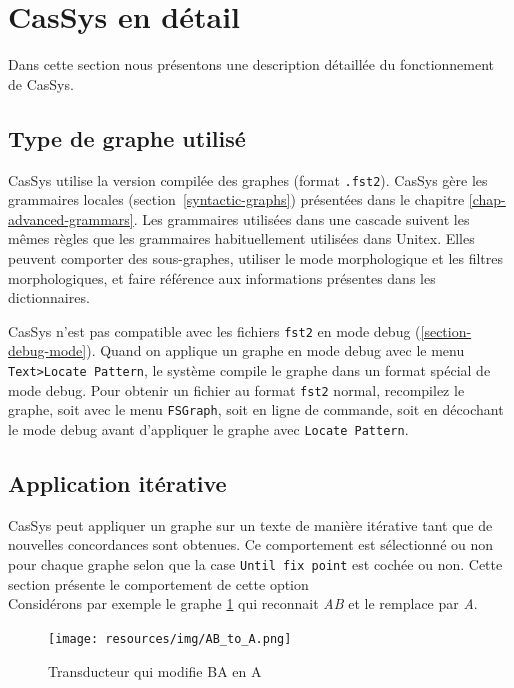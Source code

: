 \section{CasSys en détail}

Dans cette section nous présentons une description détaillée du fonctionnement de CasSys.

\subsection{Type de graphe utilisé}
\label{graphs-for-cassys}

CasSys utilise la version compilée des graphes (format \verb+.fst2+). CasSys gère les grammaires locales
(section~\ref{syntactic-graphs}) présentées dans le chapitre \ref{chap-advanced-grammars}.
Les grammaires utilisées dans une cascade suivent les mêmes règles que les grammaires habituellement
utilisées dans Unitex. Elles peuvent comporter des sous-graphes, utiliser le mode morphologique et les filtres
morphologiques, et faire référence aux informations présentes dans les dictionnaires. 

\bigskip
\noindent CasSys n'est pas compatible avec les fichiers \verb+fst2+ en mode debug (\ref{section-debug-mode}).
Quand on applique un graphe en mode debug avec le menu \verb+Text>Locate Pattern+, le système
compile le graphe dans un format spécial de mode debug. Pour obtenir un fichier au format \verb+fst2+ normal,
recompilez le graphe, soit avec le menu \verb+FSGraph+, soit en ligne de commande, soit en décochant le mode
debug avant d'appliquer le graphe avec \verb+Locate Pattern+.

\subsection{Application itérative}
\label{sub:AppWhiCon}

CasSys peut appliquer un graphe sur un texte de manière itérative tant que de nouvelles concordances sont obtenues.
Ce comportement est sélectionné ou non pour chaque graphe selon que la case \verb+Until fix point+ est cochée ou non. Cette section présente le comportement de cette option\\

Considérons par exemple le graphe \ref{fig:AB->A} qui reconnait \emph{AB} et le remplace par \emph{A}.\\

\begin{figure}[!htbp]
  \centering
  \texttt{[image: resources/img/AB\_to\_A.png]}
  \caption{Transducteur qui modifie BA en A}
  \label{fig:AB->A}
\end{figure}

